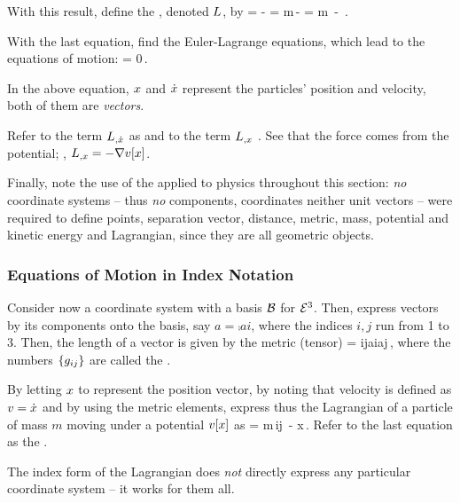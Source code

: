 With this result, define the , denoted $L$, by
\beq
\lag\vat{\pvec, \dt\pvec} = \ken - \pen 
                          = m\,\dt\pvec\iprod\dt\pvec - \pen\vat\pvec 
                          = m\,\metric{\dt\pvec,\dt\pvec} - \pen\vat\pvec \,.
\eeq

With the last equation, find the Euler-Lagrange equations, which lead to the equations of motion:
\beq
{} = 0\,.
\eeq

\begin{remark}
In the above equation, $x$ and $\dot{x}$ represent the particles' position and velocity, both of them are \emph{vectors}.
\end{remark}

Refer to the term ${L}_{,{\dot{x}}}$ as  and to the term ${L}_{,{x}}$ . See that the force comes from the potential; \ie, ${L}_{,{x}} = -\nabla v\!\left[{x}\right]$.

Finally, note the use of the  applied to physics throughout this section: \emph{no} coordinate systems -- thus \emph{no} components, coordinates neither unit vectors -- were required to define points, separation vector, distance, metric, mass, potential and kinetic energy and Lagrangian, since they are all geometric objects.


\subsubsection{Equations of Motion in Index Notation}
Consider now a coordinate system with a basis $\mathcal{B}$ for $\mathcal{E}^{3}$. Then, express vectors by its components onto the basis, say $a = \comp ai$, where the indices $i,j$ run from 1 to 3. Then, the length of a vector is given by the metric (tensor)
\beq
\metric{} = \imet ij\comp ai\comp aj\,,
\eeq
where the numbers $\left\lbrace{g_{{i}{j}}}\right\rbrace$ are called the .

By letting $x$ to represent the position vector, by noting that velocity is defined as $v = \dot{x}$ and by using the metric elements, express thus the Lagrangian of a particle of mass $m$ moving under a potential $v\!\left[{x}\right]$ as
\beq
\lag =  m\,\imet ij\, - \pen\vat x\,.
\eeq
Refer to the last equation as the .

\begin{remark}
The index form of the Lagrangian does \emph{not} directly express any particular coordinate system -- it works for them all.
\end{remark}

